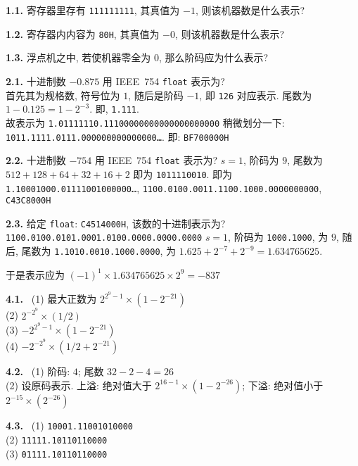 \documentclass[12pt]{ctexart}
\theoremstyle{definition}
\theoremstyle{definition}
\theoremstyle{plain}
\theoremstyle{remark}
\begin{document}
\setlength{\hangindent}{30pt}
\noindent
\textbf{1.1. } 寄存器里存有 \texttt{111111111}, 其真值为 \(-1\), 则该机器数是什么表示?

\setlength{\hangindent}{30pt}
\noindent
\textbf{1.2. } 寄存器内内容为 \texttt{80H}, 其真值为 \(-0\), 则该机器数是什么表示?

\setlength{\hangindent}{30pt}
\noindent
\textbf{1.3. } 浮点机之中, 若使机器零全为 \(0\), 那么阶码应为什么表示? 

\setlength{\hangindent}{30pt}
\noindent
\textbf{2.1. } 十进制数 \(-0.875\) 用 IEEE~754 \verb|float| 表示为?\\
首先其为规格数, 符号位为 \(1\), 随后是阶码 \(-1\), 即 \texttt{126} 对应表示. 尾数为 \(1 - 0.125 = 1 - 2 ^{-3}\). 
即, \texttt{1.111}. \\
故表示为 \texttt{1.01111110.11100000000000000000000}
稍微划分一下: \\ \texttt{1011.1111.0111.000000000000000\dots}. 即: \texttt{BF700000H}

\setlength{\hangindent}{30pt}
\noindent
\textbf{2.2. } 十进制数 \(-754\) 用 IEEE~754 \verb|float| 表示为? 
\(s = 1\), 阶码为 \(9\), 尾数为 \(512 + 128 +  64 +  32 + 16 + 2\) 即为 \texttt{1011110010}. 
即为 
\texttt{1.10001000.01111001000000\dots}, \texttt{1100.0100.0011.1100.1000.0000000000}, \texttt{C43C8000H}


\setlength{\hangindent}{30pt}
\noindent
\textbf{2.3. } 给定 \verb|float|: \verb|C4514000H|, 该数的十进制表示为? 
\texttt{1100.0100.0101.0001.0100.0000.0000.0000}
\(s = 1\), 阶码为 \texttt{1000.1000}, 为 \(9\), 随后, 尾数为 \texttt{1.1010.0010.1000.0000}, 为 \(1.625 + 2 ^{-7} + 2 ^{-9} = 1.634765625\). 

于是表示应为 \((-1) ^{1} \times 1.634765625 \times 2 ^{9}= -837\)


\setlength{\hangindent}{30pt}
\noindent
\textbf{4.1.} \ (1) 最大正数为 \(2 ^{2 ^{9} - 1} \times (1 - 2 ^{-21})\)  \\
(2) \(2 ^{- 2 ^{9}} \times (1/2)\) \\
(3) \(-2 ^{2 ^{9} - 1} \times (1 - 2 ^{-21})\)\\
(4) \(-2 ^{ - 2^{9} } \times (1/2 + 2 ^{-21})\)

\setlength{\hangindent}{30pt}
\noindent
\textbf{4.2.} \ (1) 阶码: \(4\); 尾数 \(32 - 2 - 4 = 26\) \\ 
(2) 设原码表示. 上溢: 绝对值大于 \(2 ^{16 - 1} \times (1 - 2 ^{-26})\); 下溢: 绝对值小于 \(2 ^{-15} \times (2 ^{-26})\)

\setlength{\hangindent}{30pt}
\noindent
\textbf{4.3.} \
(1) 
\texttt{10001.11001010000}\\
(2) \texttt{11111.10110110000}\\
(3) \texttt{01111.10110110000}
\end{document}
